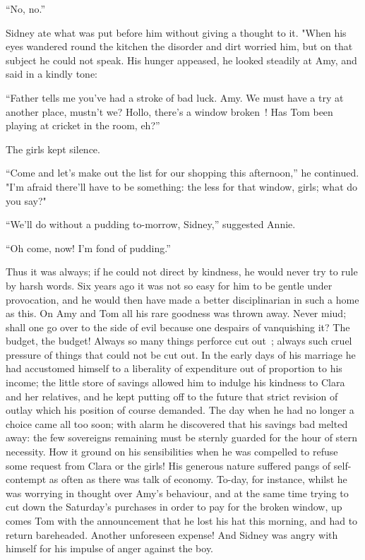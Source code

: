 ``No, no.''

Sidney ate what was put before him without giving a thought to it. "When
his eyes wandered round the kitchen the disorder and dirt worried him,
but on that subject he could not speak. His hunger appeased, he looked
steadily at Amy, and said in a kindly tone:

``Father tells me you've had a stroke of bad luck. Amy. We must have a
try at another place, mustn't we? Hollo, there's a window broken~! Has
Tom been playing at cricket in the room, eh?''

The girls kept silence.

``Come and let's make out the list for our shopping this afternoon,'' he
continued. "I'm {\protect\hypertarget{269}{}{}} afraid there'll have to
be something: the less for that window, girls; what do you say?"

``We'll do without a pudding to-morrow, Sidney,'' suggested Annie.

``Oh come, now! I'm fond of pudding.''

Thus it was always; if he could not direct by kindness, he would never
try to rule by harsh words. Six years ago it was not so easy for him to
be gentle under provocation, and he would then have made a better
disciplinarian in such a home as this. On Amy and Tom all his rare
goodness was thrown away. Never miud; shall one go over to the side of
evil because one despairs of vanquishing it? The budget, the budget!
Always so many things perforce cut out~; always such cruel pressure of
things that could not be cut out. In the early days of his marriage he
had accustomed himself to a liberality of expenditure out of proportion
to his income; the little store of savings allowed him to indulge his
kindness to Clara and her relatives, and he kept putting off to the
future that strict revision of outlay which his position of course
demanded. The day when he had no longer a choice came all too soon; with
alarm he discovered that his {\protect\hypertarget{270}{}{}}savings bad
melted away: the few sovereigns remaining must be sternly guarded for
the hour of stern necessity. How it ground on his sensibilities when he
was compelled to refuse some request from Clara or the girls! His
generous nature suffered pangs of self-contempt as often as there was
talk of economy. To-day, for instance, whilst he was worrying in thought
over Amy's behaviour, and at the same time trying to cut down the
Saturday's purchases in order to pay for the broken window, up comes Tom
with the announcement that he lost his hat this morning, and had to
return bareheaded. Another unforeseen expense! And Sidney was angry with
himself for his impulse of anger against the boy.

